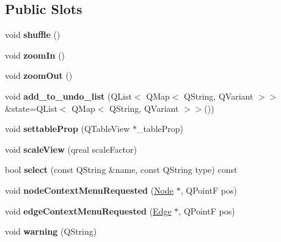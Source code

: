 \subsection*{Public Slots}
\begin{DoxyCompactItemize}
\item 
\mbox{\label{class_graph_widget_a7d6d1788eba5dcebe750ce08aee4d614}} 
void {\bfseries shuffle} ()
\item 
\mbox{\label{class_graph_widget_a89aa46ebccc40f6ba1e25b2ef18b82cc}} 
void {\bfseries zoom\+In} ()
\item 
\mbox{\label{class_graph_widget_afccca31b4490ec38718b437e78740777}} 
void {\bfseries zoom\+Out} ()
\item 
\mbox{\label{class_graph_widget_a05675ac4252ed34aa944e5979adfbd7a}} 
void {\bfseries add\+\_\+to\+\_\+undo\+\_\+list} (Q\+List$<$ Q\+Map$<$ Q\+String, Q\+Variant $>$$>$ \&state=Q\+List$<$ Q\+Map$<$ Q\+String, Q\+Variant $>$$>$())
\item 
\mbox{\label{class_graph_widget_aad13fb8f321642503491f21388e11d59}} 
void {\bfseries settable\+Prop} (Q\+Table\+View $\ast$\+\_\+table\+Prop)
\item 
\mbox{\label{class_graph_widget_a53052eaaed3777d102e6659e3357983e}} 
void {\bfseries scale\+View} (qreal scale\+Factor)
\item 
\mbox{\label{class_graph_widget_a01350de0dbcabfe176b9b300b9d99ee8}} 
bool {\bfseries select} (const Q\+String \&name, const Q\+String type) const
\item 
\mbox{\label{class_graph_widget_a328e36038ac4c2bc050fa19426957eb2}} 
void {\bfseries node\+Context\+Menu\+Requested} (\hyperlink{class_node}{Node} $\ast$, Q\+PointF pos)
\item 
\mbox{\label{class_graph_widget_a5598498d73ac62d94f8928c6dcda5368}} 
void {\bfseries edge\+Context\+Menu\+Requested} (\hyperlink{class_edge}{Edge} $\ast$, Q\+PointF pos)
\item 
\mbox{\label{class_graph_widget_a1bb5e7e12a16d964e9f9d6b703080246}} 
void {\bfseries warning} (Q\+String)
\end{DoxyCompactItemize}
